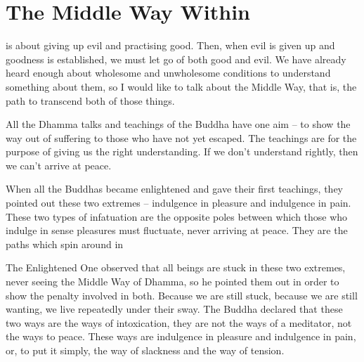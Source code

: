 
\chapter{The Middle Way Within}

 is about giving up evil and practising good. Then, when evil is given up and goodness is established, we must let go of both good and evil. We have already heard enough about wholesome and unwholesome conditions to understand something about them, so I would like to talk about the Middle Way, that is, the path to transcend both of those things. 

All the Dhamma talks and teachings of the Buddha have one aim -- to show the way out of suffering to those who have not yet escaped. The teachings are for the purpose of giving us the right understanding. If we don't understand rightly, then we can't arrive at peace. 

When all the Buddhas became enlightened and gave their first teachings, they pointed out these two extremes -- indulgence in pleasure and indulgence in pain. These two types of infatuation are the opposite poles between which those who indulge in sense pleasures must fluctuate, never arriving at peace. They are the paths which spin around in 

The Enlightened One observed that all beings are stuck in these two extremes, never seeing the Middle Way of Dhamma, so he pointed them out in order to show the penalty involved in both. Because we are still stuck, because we are still wanting, we live repeatedly under their sway. The Buddha declared that these two ways are the ways of intoxication, they are not the ways of a meditator, not the ways to peace. These ways are indulgence in pleasure and indulgence in pain, or, to put it simply, the way of slackness and the way of tension. 

